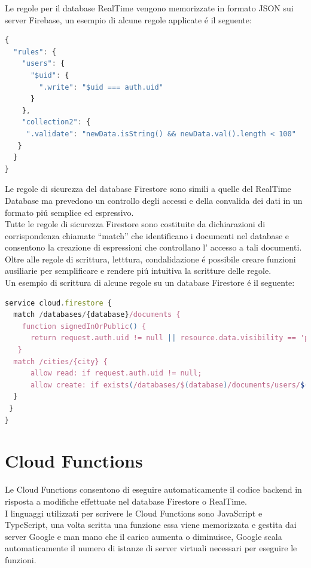 Le regole per il database RealTime vengono memorizzate in formato JSON sui server Firebase, un esempio di alcune regole applicate \'e il seguente:


\begin{lstlisting}[language=javascript,caption={Firebase Rules esempio }]
{
  "rules": {
    "users": {
      "$uid": {
        ".write": "$uid === auth.uid"
      }
    },
    "collection2": {
     ".validate": "newData.isString() && newData.val().length < 100"
   }
  }
}
\end{lstlisting}




Le regole di sicurezza del database Firestore sono simili a quelle del RealTime Database ma prevedono un controllo degli accessi e della convalida dei dati in un formato pi\'u semplice ed espressivo.\\
Tutte le regole di sicurezza Firestore sono costituite da dichiarazioni di corrispondenza chiamate ``match'' che identificano i documenti nel database e consentono la creazione di espressioni che controllano l' accesso a tali documenti.\\
Oltre alle regole di scrittura, letttura, condalidazione \'e possibile creare funzioni ausiliarie per semplificare e rendere pi\'u intuitiva la scritture delle regole.\\
Un esempio di scrittura di alcune regole su un database Firestore \'e il seguente:

\begin{lstlisting}[language=javascript,caption={Firestore Rules}]
service cloud.firestore {
  match /databases/{database}/documents {
    function signedInOrPublic() {
      return request.auth.uid != null || resource.data.visibility == 'public';
   }
  match /cities/{city} {
      allow read: if request.auth.uid != null;
      allow create: if exists(/databases/$(database)/documents/users/$(request.auth.uid))
  }
 }
}
\end{lstlisting}



\section{Cloud Functions}                 %

Le Cloud Functions consentono di eseguire automaticamente il codice backend in risposta a modifiche effettuate nel database Firestore o RealTime.\\
I linguaggi utilizzati per scrivere le Cloud Functions sono JavaScript e TypeScript, una volta scritta una funzione essa viene memorizzata e gestita dai server Google e man mano che il carico aumenta o diminuisce, Google scala automaticamente il numero di istanze di server virtuali necessari per eseguire le funzioni.


